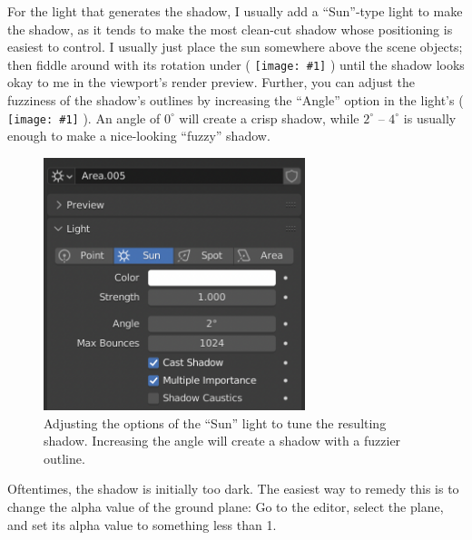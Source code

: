 \documentclass[10pt]{article}
\DeclareRobustCommand{\inlinepic}[1]{%
  \begingroup\normalfont
  \texttt{[image: \#1]}%
  \endgroup
}
\begin{document}
For the light that generates the shadow, I usually add a ``Sun''-type light to make the shadow, as it tends to make the most clean-cut shadow whose positioning is easiest to control. I usually just place the sun somewhere above the scene objects; then fiddle around with its rotation under  (\inlinepic{images/object-properties-icon.png}) until the shadow looks okay to me in the viewport's render preview. Further, you can adjust the fuzziness of the shadow's outlines by increasing the ``Angle'' option in the light's  (\inlinepic{images/object-data-properties-light.png}). An angle of $0^\circ$ will create a crisp shadow, while $2^\circ$ -- $4^\circ$ is usually enough to make a nice-looking ``fuzzy'' shadow.
\begin{figure}[H]
    \centering
    \includegraphics[width=3in]{images/sun-options.png}
    \caption{Adjusting the options of the ``Sun'' light to tune the resulting shadow. Increasing the angle will create a shadow with a fuzzier outline.}
    \label{fig:sun-options}
\end{figure}
Oftentimes, the shadow is initially too dark. The easiest way to remedy this is to change the alpha value of the ground plane: Go to the  editor, select the plane, and set its alpha value to something less than 1.
\end{document}

